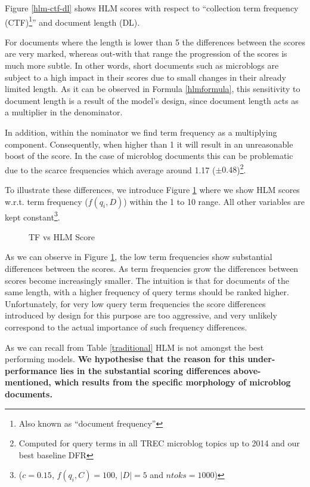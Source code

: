 Figure \ref{hlm-ctf-dl} shows HLM scores with respect to ``collection term frequency (CTF)\footnote{Also known as ``document frequency''}'' and document length (DL). 

For documents where the length is lower than 5 the differences between the scores are very marked, whereas out-with that range the progression of the scores is much more subtle. In other words, short documents such as microblogs are subject to a high impact in their scores due to small changes in their already limited length. As it can be observed in Formula \ref{hlmformula}, this sensitivity to document length is a result of the model's design, since document length acts as a multiplier in the denominator. 

In addition, within the nominator we find term frequency as a multiplying component. Consequently, when higher than 1 it will result in an unreasonable boost of the score. In the case of microblog documents this can be problematic due to the scarce frequencies which average around 1.17 ($\pm 0.48$)\footnote{Computed for query terms in all TREC microblog topics up to 2014 and our best baseline DFR}.
 
To illustrate these differences, we introduce Figure \ref{hlmcomp} where we show HLM scores w.r.t. term frequency ($f(q_i, D)$) within the 1 to 10 range. All other variables are kept constant\footnote{($c = 0.15$, $f(q_i, C) = 100$, $|D| = 5$ and $ntoks = 1000$)}.

\begin{figure}[]
  \centering
   
     \caption{TF vs HLM Score}
  \label{hlmcomp}
\end{figure}

As we can observe in Figure \ref{hlmcomp}, the low term frequencies show substantial differences between the scores. As term frequencies grow the differences between scores become increasingly smaller. The intuition is that for documents of the same length, with a higher frequency of query terms should be ranked higher. Unfortunately, for very low query term frequencies the score differences introduced by design for this purpose are too aggressive, and very unlikely correspond to the actual importance of such frequency differences.

As we can recall from Table \ref{traditional} HLM is not amongst the best performing models. \textbf{We hypothesise that the reason for this under-performance lies in the substantial scoring differences above-mentioned, which results from the specific morphology of microblog documents. }

